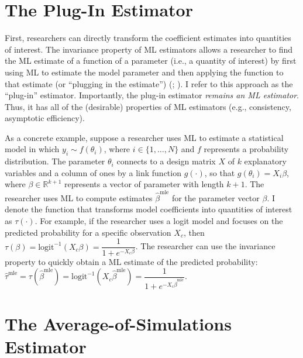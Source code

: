 \documentclass[12pt]{article}
\begin{document}
\section*{The Plug-In Estimator}

First, researchers can directly transform the coefficient estimates into quantities of interest. 
The invariance property of ML estimators allows a researcher to find the ML estimate of a function of a parameter (i.e., a quantity of interest) by first using ML to estimate the model parameter and then applying the function to that estimate (or ``plugging in the estimate'') (\citealt[pp.\@ 75--76]{King1989}; \citealt[pp.\@ 320--321]{CasellaBerger2002}). 
I refer to this approach as the ``plug-in'' estimator. Importantly, the plug-in estimator \textit{remains an ML estimator}. Thus, it has all of the (desirable) properties of ML estimators (e.g., consistency, asymptotic efficiency). 

As a concrete example, suppose a researcher uses ML to estimate a statistical model in which $y_i \sim f(\theta_i)$, where $i \in \{1,\ldots, N\}$ and $f$ represents a probability distribution. 
The parameter $\theta_i$ connects to a design matrix $X$ of $k$ explanatory variables and a column of ones by a link function $g(\cdot)$, so that $g(\theta_i) = X_i\beta$, where $\beta \in \mathbb{R}^{k+1}$ represents a vector of parameter with length $k + 1$. 
The researcher uses ML to compute estimates $\hat{\beta}^{\text{mle}}$ for the parameter vector $\beta$. 
I denote the function that transforms model coefficients into quantities of interest as $\tau(\cdot)$. 
For example, if the researcher uses a logit model and focuses on the predicted probability for a specific observation $X_c$, then $\tau(\beta) = \text{logit}^{-1}( X_c \beta) = \dfrac{1}{1 + e^{-X_c\beta}}$. 
The researcher can use the invariance property to quickly obtain a ML estimate of the predicted probability: $\hat{\tau}^{\text{mle}} = \tau \left( \hat{\beta}^{\text{mle}}\right) = \text{logit}^{-1} \left( X_c \hat{\beta}^{\text{mle}} \right) = \dfrac{1}{1 + e^{-X_c \hat{\beta}^{\text{mle}}}}$.


\section*{The Average-of-Simulations Estimator}
\end{document}
